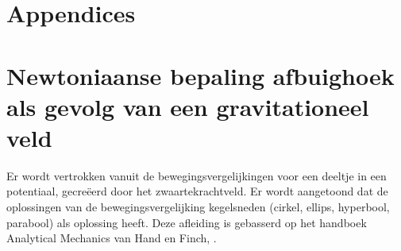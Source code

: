 \newpage
\appendix
{}
\section*{Appendices}
\section{Newtoniaanse bepaling afbuighoek als gevolg van een gravitationeel veld}
\label{appendix: newton}
Er wordt vertrokken vanuit de bewegingsvergelijkingen voor een deeltje in een potentiaal, gecreëerd door het zwaartekrachtveld. Er wordt aangetoond dat de oplossingen van de bewegingsvergelijking kegelsneden (cirkel, ellips, hyperbool, parabool) als oplossing heeft. Deze afleiding is gebasserd op het handboek Analytical Mechanics van Hand en Finch, \cite{hand-1998}.

